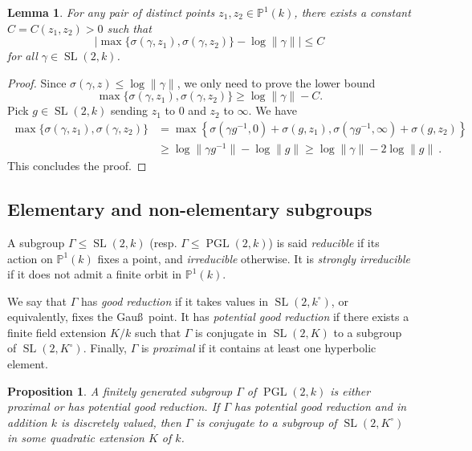 \documentclass[11pt]{article}
\newtheorem{lemm}[theo]{Lemma}
\newtheorem{prop}[theo]{Proposition}
\theoremstyle{definition}
\numberwithin{equation}{section}
\numberwithin{figure}{section}
\numberwithin{table}{section}
\DeclareMathOperator{\SL}{SL}
\DeclareMathOperator{\PGL}{PGL}
\newcommand{\PP}{\mathbb{P}}
\newcommand{\SLk}{\SL(2,k)}
\newcommand{\PGLk}{\PGL(2, k)}
\begin{document}
\begin{lemm}\label{lem:two points}
For any pair of distinct points $z_1, z_2 \in \PP^1(k)$, there exists a constant $C = C(z_1, z_2)>0$ such that
\[
\left| \max \{ \sigma(\gamma, z_1), \sigma(\gamma, z_2)\} - \log \| \gamma \| \right|
\le C
\]
for all $\gamma\in \SL(2,k)$.
\end{lemm}
\begin{proof}
Since $ \sigma(\gamma, z) \le \log \| \gamma\|$, we only need to prove the lower bound
\[
\max \{ \sigma(\gamma, z_1), \sigma(\gamma, z_2)\} \ge \log \| \gamma \| -C.
\]
Pick $g\in \SLk$ sending $z_1$ to $0$ and $z_2$ to $\infty$. We have
\begin{align*}
\max \{ \sigma(\gamma, z_1), \sigma(\gamma, z_2)\} &=
\max \left\{ \sigma(\gamma g^{-1}, 0) + \sigma (g,z_1), \sigma(\gamma g^{-1}, \infty) + \sigma (g,z_2)\right\}\\
&\ge \log \| \gamma g^{-1}\| -\log \| g \| \ge \log \| \gamma\| - 2\log \| g \|~.
\end{align*}
This concludes the proof.
\end{proof}



\subsection{Elementary and non-elementary subgroups} \label{subs:elementary}

A subgroup $\Gamma\leq \SLk$ (resp. $\Gamma \leq \PGLk$) is said \emph{reducible} if its action on $\PP^1(k)$ fixes a point, and \emph{irreducible} otherwise. It is \emph{strongly irreducible} if it does not admit a finite orbit in $\PP^1(k)$.

We say that $\Gamma$ has \emph{good reduction} if it takes values in $\SL(2,k^\circ)$, or equivalently, fixes the Gau\ss~point. It has \emph{potential good reduction} if there exists a finite field extension $K/k$ such that $\Gamma$ is conjugate in $\SL(2,K)$ to a subgroup of $\SL(2,K^\circ)$. Finally, $\Gamma$ is \emph{proximal } if it contains at least one hyperbolic element.

\begin{prop}\label{prop:fixed point}
A finitely generated subgroup $\Gamma$ of $\PGLk$ is either proximal or has potential good reduction. If $\Gamma$ has potential good reduction and in addition $k$ is discretely valued, then $\Gamma$ is conjugate to a subgroup of $\SL(2,K^\circ)$ in some quadratic extension $K$ of $k$.
\end{prop}
\end{document}

